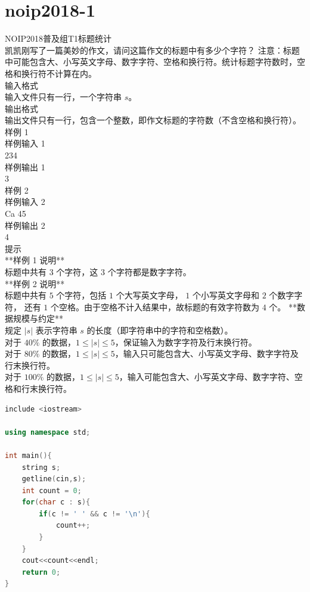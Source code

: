 \documentclass[12pt,twiside,a4paper]{ctexbook}
\numberwithin{chapter}{part}
\begin{document}
\section{noip2018-1}
NOIP2018普及组T1标题统计\\
凯凯刚写了一篇美妙的作文，请问这篇作文的标题中有多少个字符？ 注意：标题中可能包含大、小写英文字母、数字字符、空格和换行符。统计标题字符数时，空格和换行符不计算在内。\\
输入格式\\
输入文件只有一行，一个字符串 $s$。\\
输出格式\\
输出文件只有一行，包含一个整数，即作文标题的字符数（不含空格和换行符）。\\
样例 1\\
样例输入 1\\
234\\
样例输出 1\\
3\\
 样例 2\\
 样例输入 2\\
Ca 45\\
 样例输出 2\\
4\\
 提示\\
**样例 1 说明**   \\
标题中共有 3 个字符，这 3 个字符都是数字字符。\\
**样例 2 说明**\\
标题中共有 $ 5$ 个字符，包括 $1$ 个大写英文字母， $1$ 个小写英文字母和 $2$ 个数字字符， 还有 $1$ 个空格。由于空格不计入结果中，故标题的有效字符数为 $4$ 个。 
**数据规模与约定**\\
规定 $|s|$ 表示字符串 $s$ 的长度（即字符串中的字符和空格数）。\\    
对于 $40\%$ 的数据，$1 ≤ |s| ≤ 5$，保证输入为数字字符及行末换行符。\\   
对于 $80\%$ 的数据，$1 ≤ |s| ≤ 5$，输入只可能包含大、小写英文字母、数字字符及行末换行符。\\   
对于 $100\%$ 的数据，$1 ≤ |s| ≤ 5$，输入可能包含大、小写英文字母、数字字符、空格和行末换行符。\\
\begin{lstlisting}[language=C++,breaklines=true]
include <iostream>

using namespace std;

int main(){
	string s;
	getline(cin,s);
	int count = 0;
	for(char c : s){
		if(c != ' ' && c != '\n'){
			count++;
		}
	}
	cout<<count<<endl;
	return 0;
}
\end{lstlisting}
\end{document}
